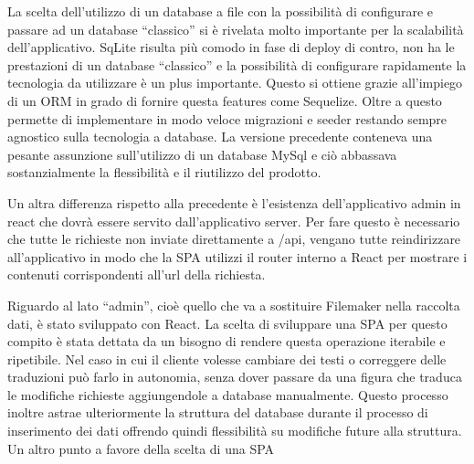 La scelta dell’utilizzo di un database a file con la possibilità di configurare e passare ad un database “classico” si è rivelata molto importante per la scalabilità dell’applicativo. SqLite risulta più comodo in fase di deploy di contro, non ha le prestazioni di un database “classico” e la possibilità di configurare rapidamente la tecnologia da utilizzare è un plus importante. Questo si ottiene grazie all’impiego di un ORM in grado di fornire questa features come Sequelize. Oltre a questo permette di implementare in modo veloce migrazioni e seeder restando sempre agnostico sulla tecnologia a database. La versione precedente conteneva una pesante assunzione sull’utilizzo di un database MySql e ciò abbassava sostanzialmente la flessibilità e il riutilizzo del prodotto.\vspace{5mm}

Un altra differenza rispetto alla precedente è l’esistenza dell’applicativo admin in react che dovrà essere servito dall’applicativo server. Per fare questo è necessario che tutte le richieste non inviate direttamente a /api, vengano tutte reindirizzare all’applicativo in modo che la SPA utilizzi il router interno a React per mostrare i contenuti corrispondenti all’url della richiesta.\vspace{5mm}

Riguardo al lato “admin”, cioè quello che va a sostituire Filemaker nella raccolta dati, è stato sviluppato con React. La scelta di sviluppare una SPA\cite{SPA} per questo compito è stata dettata da un bisogno di rendere questa operazione iterabile e ripetibile. Nel caso in cui il cliente volesse cambiare dei testi o correggere delle traduzioni può farlo in autonomia, senza dover passare da una figura che traduca le modifiche richieste aggiungendole a database manualmente. Questo processo inoltre astrae ulteriormente la struttura del database durante il processo di inserimento dei dati offrendo quindi flessibilità su modifiche future alla struttura. Un altro punto a favore della scelta di una SPA \vspace{5mm}

